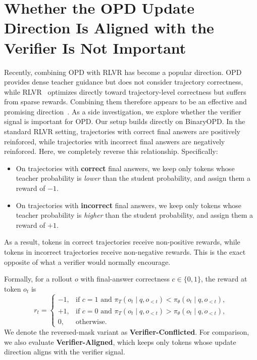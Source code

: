\documentclass{article}
\theoremstyle{remark}
\begin{document}
\section{Whether the OPD Update Direction Is Aligned with the Verifier Is Not Important}\label{app:verifier}
Recently, combining OPD with RLVR has become a popular direction. OPD provides dense teacher guidance but does not consider trajectory correctness, while RLVR~\citep{DeepSeekR1,DeepSeekMath,jaech2024openai,trinh2024solving,yang2024qwen2} optimizes directly toward trajectory-level correctness but suffers from sparse rewards. Combining them therefore appears to be an effective and promising direction~\citep{wang2026distilled,cai2026h,hou2026uni,yang2026self,akhondzadeh2026reward,lin2026policy,ding2026saf}. As a side investigation, we explore whether the verifier signal is important for OPD. Our setup builds directly on BinaryOPD. In the standard RLVR setting, trajectories with correct final answers are positively reinforced, while trajectories with incorrect final answers are negatively reinforced. Here, we completely reverse this relationship. Specifically:

\begin{itemize}
    \item On trajectories with \textbf{correct} final answers, we keep only tokens whose teacher probability is \emph{lower} than the student probability, and assign them a reward of \(-1\).
    \item On trajectories with \textbf{incorrect} final answers, we keep only tokens whose teacher probability is \emph{higher} than the student probability, and assign them a reward of \(+1\).
\end{itemize}

As a result, tokens in correct trajectories receive non-positive rewards, while tokens in incorrect trajectories receive non-negative rewards. This is the exact opposite of what a verifier would normally encourage.

Formally, for a rollout \(o\) with final-answer correctness \(c \in \{0,1\}\), the reward at token \(o_t\) is
\[
r_t =
\begin{cases}
-1, & \text{if } c = 1 \text{ and } \pi_T(o_t \mid q, o_{<t}) < \pi_\theta(o_t \mid q, o_{<t}), \\[2pt]
+1, & \text{if } c = 0 \text{ and } \pi_T(o_t \mid q, o_{<t}) > \pi_\theta(o_t \mid q, o_{<t}), \\[2pt]
0,  & \text{otherwise}.
\end{cases}
\]
We denote the reversed-mask variant as \textbf{Verifier-Conflicted}. For comparison, we also evaluate \textbf{Verifier-Aligned}, which keeps only tokens whose update direction aligns with the verifier signal.
\end{document}
